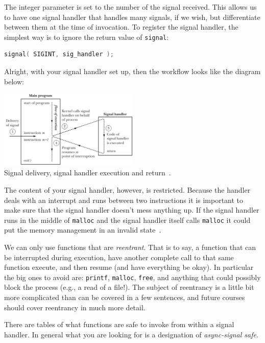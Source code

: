 The integer parameter is set to the number of the signal received. This allows us to have one signal handler that handles many signals, if we wish, but differentiate between them at the time of invocation. To register the signal handler, the simplest way is to ignore the return value of \texttt{signal}:

\begin{lstlisting}[language=C]
signal( SIGINT, sig_handler );
\end{lstlisting}

Alright, with your signal handler set up, then the workflow looks like the diagram below:

\begin{center}
	\includegraphics[width=0.5\textwidth]{images/sighandler.png}\\
	Signal delivery, signal handler execution and return~\cite{lpi}.
\end{center}

The content of your signal handler, however, is restricted. Because the handler deals with an interrupt and runs between two instructions it is important to make sure that the signal handler doesn't mess anything up. If the signal handler runs in the middle of \texttt{malloc} and the signal handler itself calls \texttt{malloc} it could put the memory management in an invalid state~\cite{apunix}.

We can only use functions that are \textit{reentrant}. That is to say, a function that can be interrupted during execution, have another complete call to that same function execute, and then resume (and have everything be okay). In particular the big ones to avoid are: \texttt{printf}, \texttt{malloc}, \texttt{free}, and anything that could possibly block the process (e.g., a read of a file!). The subject of reentrancy is a little bit more complicated than can be covered in a few sentences, and future courses should cover reentrancy in much more detail.

There are tables of what functions are safe to invoke from within a signal handler. In general what you are looking for is a designation of \textit{async-signal safe}.

